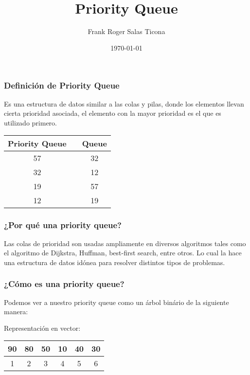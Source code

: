 \documentclass{beamer}
\title{Priority Queue}
\author{Frank Roger Salas Ticona}
\date{\today}
\begin{document}
\frame{\titlepage}

\begin{frame}
\frametitle{Definición de Priority Queue}
    Es una estructura de datos similar a las colas y pilas, donde los elementos llevan cierta prioridad asociada, el elemento con la mayor prioridad es el que es utilizado primero.
    \begin{center}
         \begin{tabular}{|c|c|c|}
            \hline
            Priority Queue &  & Queue\\
            \hline
            57 &  & 32 \\
            \hline
            32 &  & 12 \\
            \hline
            19 &  & 57 \\
            \hline
            12 &  & 19 \\
            \hline
        \end{tabular}
    \end{center}
\end{frame}

\begin{frame}
\frametitle{¿Por qué una priority queue?}
Las colas de prioridad son usadas ampliamente en diversos algoritmos tales como el algoritmo de Dijkstra, Huffman, best-first search, entre otros. Lo cual la hace una estructura de datos idónea para resolver distintos tipos de problemas.
\end{frame}

\begin{frame}
\frametitle{¿Cómo es una priority queue?}
Podemos ver a nuestro priority queue como un árbol binário de la siguiente manera:
    \begin{center}
    \end{center}
Representación en vector:\\
    \begin{center}
         \begin{tabular}{|c|c|c|c|c|c|}
            \hline
            90 & 80 & 50 & 10 & 40 & 30 \\
            \hline
            1 & 2 & 3 & 4 & 5 & 6\\
            \hline
        \end{tabular}
    \end{center}
\end{frame}
\end{document}

